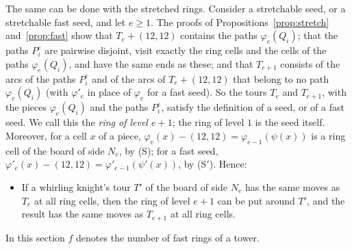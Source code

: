 \documentclass[11pt]{amsart}
\theoremstyle{remark}
\begin{document}
The same can be done with the stretched rings. Consider a stretchable seed, or a stretchable fast seed, and let
$e\ge1$. The proofs of Propositions~\ref{prop:stretch} and~\ref{prop:fast} show that $T_e+(12,12)$ contains the
paths $\varphi_e(Q_i)$; that the paths $P_i^e$ are pairwise disjoint, visit exactly the ring cells and the cells
of the paths $\varphi_e(Q_i)$, and have the same ends as these; and that $T_{e+1}$ consists of the arcs of the
paths $P_i^e$ and of the arcs of $T_e+(12,12)$ that belong to no path $\varphi_e(Q_i)$ (with $\varphi'_e$ in place
of $\varphi_e$ for a fast seed).
So the tours $T_e$ and $T_{e+1}$, with the pieces $\varphi_e(Q_i)$ and the paths $P_i^e$, satisfy the definition of
a seed, or of a fast seed. We call this the \emph{ring of level $e+1$}; the ring of level $1$ is the seed itself.
Moreover, for a cell $x$ of a piece, $\varphi_e(x)-(12,12)=\varphi_{e-1}(\psi(x))$ is a ring cell of the board of
side $N_e$, by (S); for a fast seed, $\varphi'_e(x)-(12,12)=\varphi'_{e-1}(\psi'(x))$, by (S$'$). Hence:
\begin{itemize}
\item[($*$)] If a whirling knight's tour $T'$ of the board of side $N_e$ has the same moves as $T_e$ at all ring
cells, then the ring of level $e+1$ can be put around $T'$, and the result has the same moves as $T_{e+1}$ at all
ring cells.
\end{itemize}
In this section $f$ denotes the number of fast rings of a tower.
\end{document}
